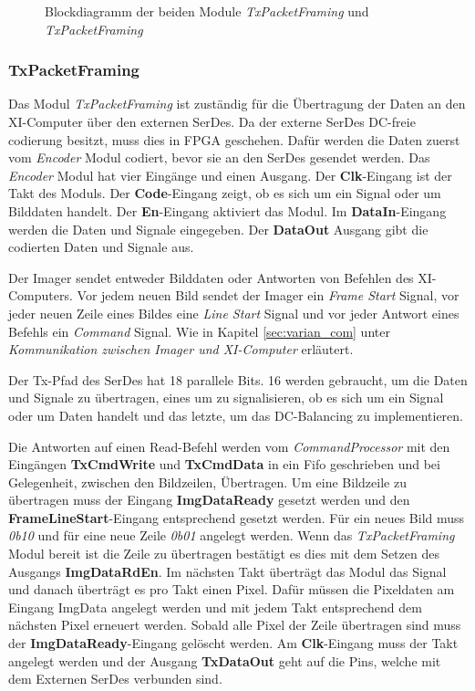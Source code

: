 \documentclass{article}
\begin{document}
\begin{figure}[tb]
    \caption{Blockdiagramm der beiden Module \textit{TxPacketFraming} und \textit{TxPacketFraming}}
    \label{fig:bd_fpga_varian}
\end{figure}

\subsubsection*{TxPacketFraming}
Das Modul \textit{TxPacketFraming} ist zuständig für die Übertragung der Daten an den XI-Computer über den externen SerDes. Da der externe SerDes DC-freie codierung besitzt, muss dies in FPGA geschehen. Dafür werden die Daten zuerst vom \textit{Encoder} Modul codiert, bevor sie an den SerDes gesendet werden. Das \textit{Encoder} Modul hat vier Eingänge und einen Ausgang.
Der \textbf{Clk}-Eingang ist der Takt des Moduls.
Der \textbf{Code}-Eingang zeigt, ob es sich um ein Signal oder um Bilddaten handelt.
Der \textbf{En}-Eingang aktiviert das Modul.
Im \textbf{DataIn}-Eingang werden die Daten und Signale eingegeben.
Der \textbf{DataOut} Ausgang gibt die codierten Daten und Signale aus.

Der Imager sendet entweder Bilddaten oder Antworten von Befehlen des XI-Computers. Vor jedem neuen Bild sendet der Imager ein \textit{Frame Start} Signal, vor jeder neuen Zeile eines Bildes eine \textit{Line Start} Signal und vor jeder Antwort eines Befehls ein \textit{Command} Signal. Wie in Kapitel \ref{sec:varian_com} unter \textit{Kommunikation zwischen Imager und XI-Computer} erläutert.

Der Tx-Pfad des SerDes hat 18 parallele Bits. 16 werden gebraucht, um die Daten und Signale zu übertragen, eines um zu signalisieren, ob es sich um ein Signal oder um Daten handelt und das letzte, um das DC-Balancing zu implementieren.

Die Antworten auf einen Read-Befehl werden vom \textit{CommandProcessor} mit den Eingängen \textbf{TxCmdWrite} und \textbf{TxCmdData} in ein Fifo geschrieben und bei Gelegenheit, zwischen den Bildzeilen, Übertragen.
Um eine Bildzeile zu übertragen muss der Eingang \textbf{ImgDataReady} gesetzt werden und den \textbf{FrameLineStart}-Eingang entsprechend gesetzt werden. Für ein neues Bild muss \textit{0b10} und für eine neue Zeile \textit{0b01} angelegt werden. Wenn das \textit{TxPacketFraming} Modul bereit ist die Zeile zu übertragen bestätigt es dies mit dem Setzen des Ausgangs \textbf{ImgDataRdEn}. Im nächsten Takt überträgt das Modul das Signal und danach überträgt es pro Takt einen Pixel. Dafür müssen die Pixeldaten am Eingang {ImgData} angelegt werden und mit jedem Takt entsprechend dem nächsten Pixel erneuert werden. Sobald alle Pixel der Zeile übertragen sind muss der \textbf{ImgDataReady}-Eingang gelöscht werden. Am \textbf{Clk}-Eingang muss der Takt angelegt werden und der Ausgang \textbf{TxDataOut} geht auf die Pins, welche mit dem Externen SerDes verbunden sind.
\end{document}
